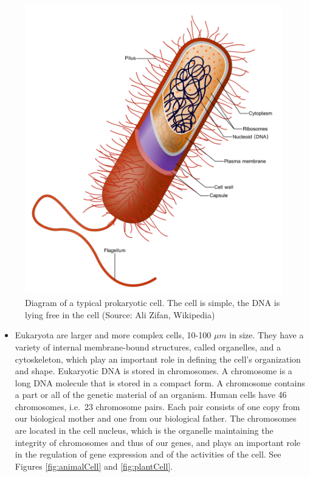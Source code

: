 \documentclass[
  11pt,
]{book}
\providecommand{\tightlist}{%
  \setlength{\itemsep}{0pt}\setlength{\parskip}{0pt}}
\begin{document}
\begin{figure}

{\centering \includegraphics[width=0.5\linewidth]{./figs/prokaryoteCell} 

}

\caption{Diagram of a typical prokaryotic cell. The cell is simple, the DNA is lying free in the cell (Source: Ali Zifan, Wikipedia)}\label{fig:prokaryotaCell}
\end{figure}

\begin{itemize}
\tightlist
\item
  Eukaryota are larger and more complex cells, 10-100 \(\mu m\) in size. They have a variety of internal membrane-bound structures, called organelles, and a cytoskeleton, which play an important role in defining the cell's organization and shape. Eukaryotic DNA is stored in chromosomes. A chromosome is a long DNA molecule that is stored in a compact form. A chromosome contains a part or all of the genetic material of an organism. Human cells have 46 chromosomes, i.e.~23 chromosome pairs. Each pair consists of one copy from our biological mother and one from our biological father. The chromosomes are located in the cell nucleus, which is the organelle maintaining the integrity of chromosomes and thus of our genes, and plays an important role in the regulation of gene expression and of the activities of the cell. See Figures \ref{fig:animalCell} and \ref{fig:plantCell}.
\end{itemize}
\end{document}
